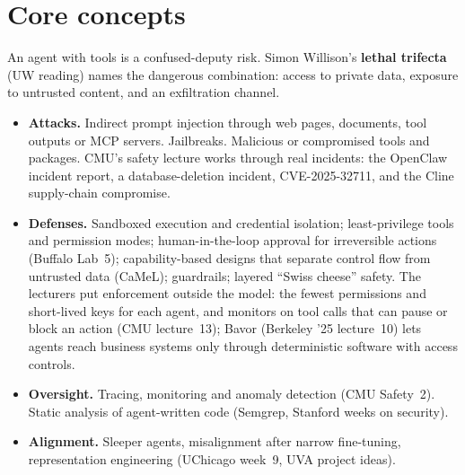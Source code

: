 \documentclass[10pt,oneside]{report}
\begin{document}
\section{Core concepts}
An agent with tools is a confused-deputy risk. Simon Willison's \textbf{lethal trifecta} (UW reading) names the dangerous combination: access to private data, exposure to untrusted content, and an exfiltration channel.
\begin{itemize}
\item \textbf{Attacks.} Indirect prompt injection through web pages, documents, tool outputs or MCP servers. Jailbreaks. Malicious or compromised tools and packages. CMU's safety lecture works through real incidents: the OpenClaw incident report, a database-deletion incident, CVE-2025-32711, and the Cline supply-chain compromise.
\item \textbf{Defenses.} Sandboxed execution and credential isolation; least-privilege tools and permission modes; human-in-the-loop approval for irreversible actions (Buffalo Lab~5); capability-based designs that separate control flow from untrusted data (CaMeL); guardrails; layered ``Swiss cheese'' safety. The lecturers put enforcement outside the model: the fewest permissions and short-lived keys for each agent, and monitors on tool calls that can pause or block an action (CMU lecture~13); Bavor (Berkeley '25 lecture~10) lets agents reach business systems only through deterministic software with access controls.
\item \textbf{Oversight.} Tracing, monitoring and anomaly detection (CMU Safety~2). Static analysis of agent-written code (Semgrep, Stanford weeks on security).
\item \textbf{Alignment.} Sleeper agents, misalignment after narrow fine-tuning, representation engineering (UChicago week~9, UVA project ideas).
\end{itemize}
\end{document}
